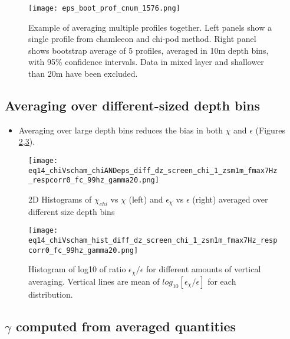 \documentclass[11pt]{article}
\begin{document}
\begin{figure}[htbp]
\texttt{[image: eps\_boot\_prof\_cnum\_1576.png]}
\caption{Example of averaging multiple profiles together. Left panels show a single profile from chamleeon and chi-pod method. Right panel shows bootstrap average of 5 profiles, averaged in 10m depth bins, with 95\% confidence intervals. Data in mixed layer and shallower than 20m have been excluded.}
\label{prof_avg_ex}
\end{figure}




\clearpage
\subsection{Averaging over different-sized depth bins}


\begin{itemize}

\item Averaging over large depth bins reduces the bias in both $\chi$ and $\epsilon$ (Figures \ref{2Dhistdiffdz},\ref{histdiffdz}).

\end{itemize}


\begin{figure}[htbp]
\texttt{[image: eq14\_chiVscham\_chiANDeps\_diff\_dz\_screen\_chi\_1\_zsm1m\_fmax7Hz\_respcorr0\_fc\_99hz\_gamma20.png]}
\caption{2D Histograms of $\chi_{chi}$ vs $\chi$ (left) and $\epsilon_{\chi}$ vs $\epsilon$ (right) averaged over different size depth bins}
\label{2Dhistdiffdz}
\end{figure}



\begin{figure}[htbp]
\texttt{[image: eq14\_chiVscham\_hist\_diff\_dz\_screen\_chi\_1\_zsm1m\_fmax7Hz\_respcorr0\_fc\_99hz\_gamma20.png]}
\caption{Histogram of log10 of ratio $\epsilon_{\chi}/\epsilon$ for different amounts of vertical averaging. Vertical lines are mean of $log_{10}[\epsilon_{\chi}/\epsilon]$ for each distribution.}
\label{histdiffdz}
\end{figure}









\clearpage
\subsection{$\gamma$ computed from averaged quantities}
\end{document}
